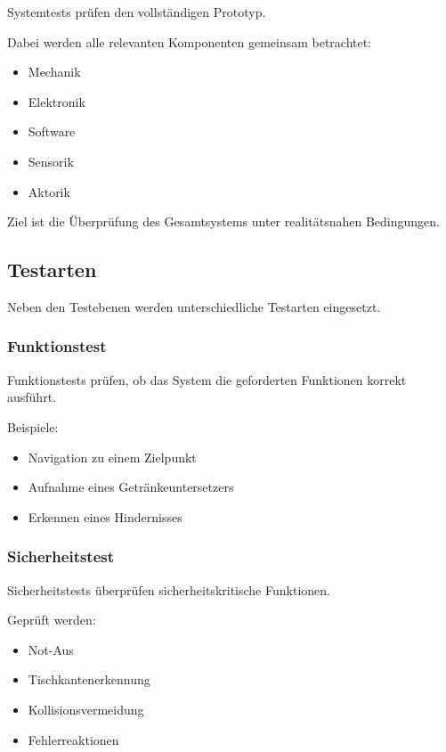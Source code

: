 Systemtests prüfen den vollständigen Prototyp.

Dabei werden alle relevanten Komponenten gemeinsam betrachtet:

\begin{itemize}
\tightlist
\item
  Mechanik
\item
  Elektronik
\item
  Software
\item
  Sensorik
\item
  Aktorik
\end{itemize}

Ziel ist die Überprüfung des Gesamtsystems unter realitätsnahen
Bedingungen.

\subsection{Testarten}\label{testarten}

Neben den Testebenen werden unterschiedliche Testarten eingesetzt.

\subsubsection{Funktionstest}\label{funktionstest}

Funktionstests prüfen, ob das System die geforderten Funktionen korrekt
ausführt.

Beispiele:

\begin{itemize}
\tightlist
\item
  Navigation zu einem Zielpunkt
\item
  Aufnahme eines Getränkeuntersetzers
\item
  Erkennen eines Hindernisses
\end{itemize}

\subsubsection{Sicherheitstest}\label{sicherheitstest}

Sicherheitstests überprüfen sicherheitskritische Funktionen.

Geprüft werden:

\begin{itemize}
\tightlist
\item
  Not-Aus
\item
  Tischkantenerkennung
\item
  Kollisionsvermeidung
\item
  Fehlerreaktionen
\end{itemize}

